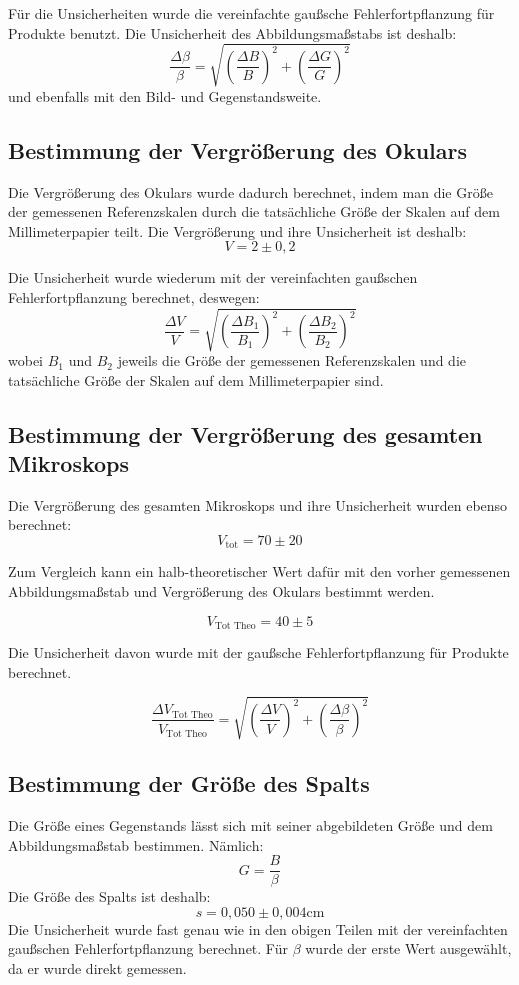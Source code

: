 \documentclass[11pt,a4paper]{article}
\begin{document}
Für die Unsicherheiten wurde die vereinfachte gaußsche Fehlerfortpflanzung für Produkte benutzt. Die Unsicherheit des Abbildungsmaßstabs ist deshalb:
$$ \frac{\Delta \beta}{\beta} = \sqrt{\left(\frac{\Delta B}{B}\right)^2+\left(\frac{\Delta G}{G}\right)^2}$$
und ebenfalls mit den Bild- und Gegenstandsweite. 

\subsection{Bestimmung der Vergrößerung des Okulars}
Die Vergrößerung des Okulars wurde dadurch berechnet, indem man die Größe der gemessenen Referenzskalen durch die tatsächliche Größe der Skalen auf dem Millimeterpapier teilt. Die Vergrößerung und ihre Unsicherheit ist deshalb:
$$ V = 2 \pm 0,2 $$ 

Die Unsicherheit wurde wiederum mit der vereinfachten gaußschen Fehlerfortpflanzung berechnet, deswegen:
$$\frac{\Delta V}{V} = \sqrt{\left(\frac{\Delta B_1}{B_1}\right)^2+\left(\frac{\Delta B_2}{B_2}\right)^2}$$
wobei $B_1$ und $B_2$ jeweils die Größe der gemessenen Referenzskalen und die tatsächliche Größe der Skalen auf dem Millimeterpapier sind. 

\subsection{Bestimmung der Vergrößerung des gesamten Mikroskops}
Die Vergrößerung des gesamten Mikroskops und ihre Unsicherheit wurden ebenso berechnet:
$$V_\textrm{tot} = 70 \pm 20$$

Zum Vergleich kann ein halb-theoretischer Wert dafür mit den vorher gemessenen Abbildungsmaßstab und Vergrößerung des Okulars bestimmt werden. 

$$V_\textrm{Tot Theo} = 40 \pm 5$$

Die Unsicherheit davon wurde mit der gaußsche Fehlerfortpflanzung für Produkte berechnet. 

$$\frac{\Delta V_\textrm{Tot Theo}}{V_\textrm{Tot Theo}} = \sqrt{\left(\frac{\Delta V}{V}\right)^2+\left(\frac{\Delta \beta}{\beta}\right)^2}$$
  
\subsection{Bestimmung der Größe des Spalts}
Die Größe eines Gegenstands lässt sich mit seiner abgebildeten Größe und dem Abbildungsmaßstab bestimmen. Nämlich:
$$ G = \frac{B}{\beta}$$
Die Größe des Spalts ist deshalb:
$$ s = 0,050 \pm 0,004 \textrm{cm}$$
Die Unsicherheit wurde fast genau wie in den obigen Teilen mit der vereinfachten gaußschen Fehlerfortpflanzung berechnet. Für $\beta$ wurde der erste Wert ausgewählt, da er wurde direkt gemessen. 
\end{document}

